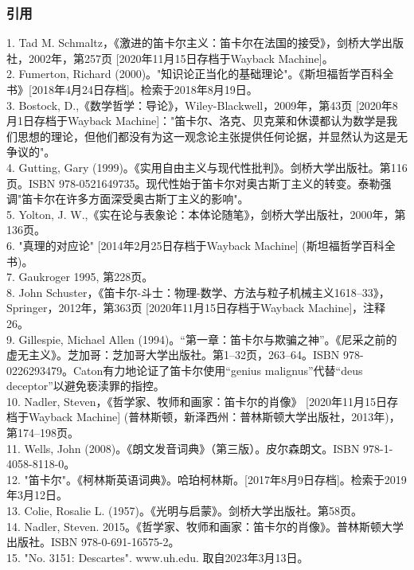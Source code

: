 \subsubsection{引用}
1. Tad M. Schmaltz，《激进的笛卡尔主义：笛卡尔在法国的接受》，剑桥大学出版社，2002年，第257页 [2020年11月15日存档于Wayback Machine]。\\
2. Fumerton, Richard (2000)。"知识论正当化的基础理论"。《斯坦福哲学百科全书》[2018年4月24日存档]。检索于2018年8月19日。\\
3. Bostock, D.,《数学哲学：导论》，Wiley-Blackwell，2009年，第43页 [2020年8月1日存档于Wayback Machine]："笛卡尔、洛克、贝克莱和休谟都认为数学是我们思想的理论，但他们都没有为这一观念论主张提供任何论据，并显然认为这是无争议的"。\\
4. Gutting, Gary (1999)。《实用自由主义与现代性批判》。剑桥大学出版社。第116页。ISBN 978-0521649735。现代性始于笛卡尔对奥古斯丁主义的转变。泰勒强调"笛卡尔在许多方面深受奥古斯丁主义的影响"。\\
5. Yolton, J. W.,《实在论与表象论：本体论随笔》，剑桥大学出版社，2000年，第136页。\\
6. "真理的对应论" [2014年2月25日存档于Wayback Machine] (斯坦福哲学百科全书)。\\
7. Gaukroger 1995, 第228页。\\
8. John Schuster，《笛卡尔-斗士：物理-数学、方法与粒子机械主义1618–33》，Springer，2012年，第363页 [2020年11月15日存档于Wayback Machine]，注释26。\\
9. Gillespie, Michael Allen (1994)。“第一章：笛卡尔与欺骗之神”。《尼采之前的虚无主义》。芝加哥：芝加哥大学出版社。第1–32页，263–64。ISBN 978-0226293479。Caton有力地论证了笛卡尔使用“genius malignus”代替“deus deceptor”以避免亵渎罪的指控。\\
10. Nadler, Steven，《哲学家、牧师和画家：笛卡尔的肖像》 [2020年11月15日存档于Wayback Machine] (普林斯顿，新泽西州：普林斯顿大学出版社，2013年)，第174–198页。\\
11. Wells, John (2008)。《朗文发音词典》（第三版）。皮尔森朗文。ISBN 978-1-4058-8118-0。\\
12. "笛卡尔"。《柯林斯英语词典》。哈珀柯林斯。[2017年8月9日存档]。检索于2019年3月12日。\\
13. Colie, Rosalie L. (1957)。《光明与启蒙》。剑桥大学出版社。第58页。\\
14. Nadler, Steven. 2015。《哲学家、牧师和画家：笛卡尔的肖像》。普林斯顿大学出版社。ISBN 978-0-691-16575-2。\\
15. "No. 3151: Descartes". www.uh.edu. 取自2023年3月13日。\\
